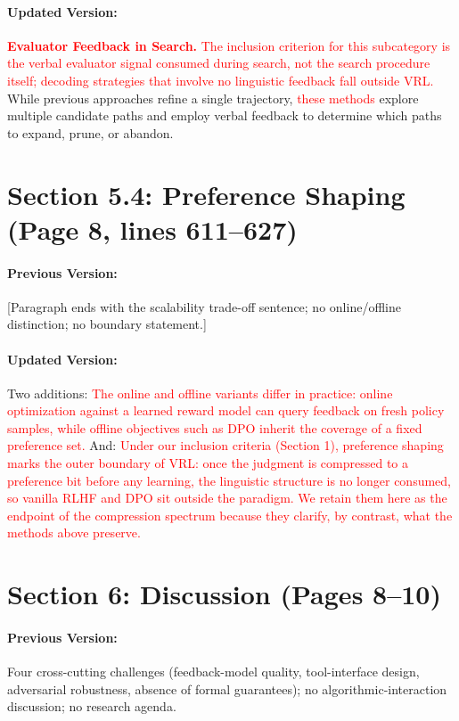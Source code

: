 \documentclass[11pt]{article}
\newcommand{\red}[1]{\textcolor{red}{#1}}
\begin{document}
\paragraph{Updated Version:} \textbf{\red{Evaluator Feedback in Search.}} \red{The inclusion criterion for this subcategory is the verbal evaluator signal consumed during search, not the search procedure itself; decoding strategies that involve no linguistic feedback fall outside VRL.} While previous approaches refine a single trajectory, \red{these methods} explore multiple candidate paths and employ verbal feedback to determine which paths to expand, prune, or abandon.

\section{Section 5.4: Preference Shaping (Page 8, lines 611--627)}

\paragraph{Previous Version:} [Paragraph ends with the scalability trade-off sentence; no online/offline distinction; no boundary statement.]

\paragraph{Updated Version:} Two additions: \red{The online and offline variants differ in practice: online optimization against a learned reward model can query feedback on fresh policy samples, while offline objectives such as DPO inherit the coverage of a fixed preference set.} And: \red{Under our inclusion criteria (Section 1), preference shaping marks the outer boundary of VRL: once the judgment is compressed to a preference bit before any learning, the linguistic structure is no longer consumed, so vanilla RLHF and DPO sit outside the paradigm. We retain them here as the endpoint of the compression spectrum because they clarify, by contrast, what the methods above preserve.}

\section{Section 6: Discussion (Pages 8--10)}

\paragraph{Previous Version:} Four cross-cutting challenges (feedback-model quality, tool-interface design, adversarial robustness, absence of formal guarantees); no algorithmic-interaction discussion; no research agenda.
\end{document}
